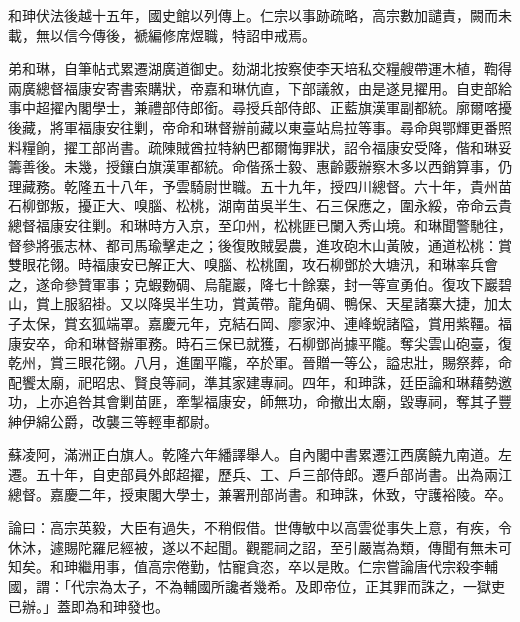 \begin{pinyinscope}
和珅伏法後越十五年，國史館以列傳上。仁宗以事跡疏略，高宗數加譴責，闕而未載，無以信今傳後，褫編修席煜職，特詔申戒焉。

弟和琳，自筆帖式累遷湖廣道御史。劾湖北按察使李天培私交糧艘帶運木植，鞫得兩廣總督福康安寄書索購狀，帝嘉和琳伉直，下部議敘，由是遂見擢用。自吏部給事中超擢內閣學士，兼禮部侍郎銜。尋授兵部侍郎、正藍旗漢軍副都統。廓爾喀擾後藏，將軍福康安往剿，帝命和琳督辦前藏以東臺站烏拉等事。尋命與鄂輝更番照料糧餉，擢工部尚書。疏陳賊酋拉特納巴都爾悔罪狀，詔令福康安受降，偕和琳妥籌善後。未幾，授鑲白旗漢軍都統。命偕孫士毅、惠齡覈辦察木多以西銷算事，仍理藏務。乾隆五十八年，予雲騎尉世職。五十九年，授四川總督。六十年，貴州苗石柳鄧叛，擾正大、嗅腦、松桃，湖南苗吳半生、石三保應之，圍永綏，帝命云貴總督福康安往剿。和琳時方入京，至卬州，松桃匪已闌入秀山境。和琳聞警馳往，督參將張志林、都司馬瑜擊走之；後復敗賊晏農，進攻砲木山黃陂，通道松桃：賞雙眼花翎。時福康安已解正大、嗅腦、松桃圍，攻石柳鄧於大塘汛，和琳率兵會之，遂命參贊軍事；克蝦覅碉、烏龍巖，降七十餘寨，封一等宣勇伯。復攻下巖碧山，賞上服貂褂。又以降吳半生功，賞黃帶。龍角碉、鴨保、天星諸寨大捷，加太子太保，賞玄狐端罩。嘉慶元年，克結石岡、廖家沖、連峰蜺諸隘，賞用紫韁。福康安卒，命和琳督辦軍務。時石三保已就獲，石柳鄧尚據平隴。奪尖雲山砲臺，復乾州，賞三眼花翎。八月，進圍平隴，卒於軍。晉贈一等公，謚忠壯，賜祭葬，命配饗太廟，祀昭忠、賢良等祠，準其家建專祠。四年，和珅誅，廷臣論和琳藉勢邀功，上亦追咎其會剿苗匪，牽掣福康安，師無功，命撤出太廟，毀專祠，奪其子豐紳伊綿公爵，改襲三等輕車都尉。

蘇凌阿，滿洲正白旗人。乾隆六年繙譯舉人。自內閣中書累遷江西廣饒九南道。左遷。五十年，自吏部員外郎超擢，歷兵、工、戶三部侍郎。遷戶部尚書。出為兩江總督。嘉慶二年，授東閣大學士，兼署刑部尚書。和珅誅，休致，守護裕陵。卒。

論曰：高宗英毅，大臣有過失，不稍假借。世傳敏中以高雲從事失上意，有疾，令休沐，遽賜陀羅尼經被，遂以不起聞。觀罷祠之詔，至引嚴嵩為類，傳聞有無未可知矣。和珅繼用事，值高宗倦勤，怙寵貪恣，卒以是敗。仁宗嘗論唐代宗殺李輔國，謂：「代宗為太子，不為輔國所讒者幾希。及即帝位，正其罪而誅之，一獄吏已辦。」蓋即為和珅發也。


\end{pinyinscope}